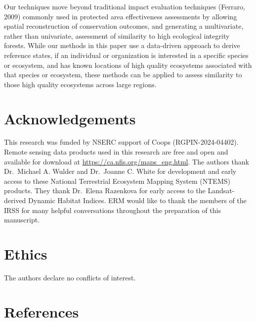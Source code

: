 \documentclass[
]{agujournal2019}
\begin{document}
Our techniques move beyond traditional impact evaluation techniques
(Ferraro, 2009) commonly used in protected area effectiveness
assessments by allowing spatial reconstruction of conservation outcomes,
and generating a multivariate, rather than univariate, assessment of
similarity to high ecological integrity forests. While our methods in
this paper use a data-driven approach to derive reference states, if an
individual or organization is interested in a specific species or
ecosystem, and has known locations of high quality ecosystems associated
with that species or ecosystem, these methods can be applied to assess
similarity to those high quality ecosystems across large regions.

\section{Acknowledgements}\label{acknowledgements}

This research was funded by NSERC support of Coops (RGPIN-2024-04402).
Remote sensing data products used in this research are free and open and
available for download at \url{https://ca.nfis.org/maps_eng.html}. The
authors thank Dr.~Michael A. Wulder and Dr.~Joanne C. White for
development and early access to these National Terrestrial Ecosystem
Mapping System (NTEMS) products. They thank Dr.~Elena Razenkova for
early access to the Landsat-derived Dynamic Habitat Indices. ERM would
like to thank the members of the IRSS for many helpful conversations
throughout the preparation of this manuscript.

\section{Ethics}\label{ethics}

The authors declare no conflicts of interest.

\section*{References}\label{references}
\end{document}
